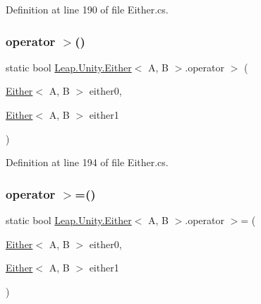 Definition at line 190 of file Either.\+cs.

\mbox{\label{struct_leap_1_1_unity_1_1_either_ae6ef9429d3c8ef042af9ca7c798aeb76}} 
\subsubsection{\texorpdfstring{operator $>$()}{operator >()}}
{\footnotesize\ttfamily static bool \mbox{\hyperlink{struct_leap_1_1_unity_1_1_either}{Leap.\+Unity.\+Either}}$<$ A, B $>$.operator $>$ (\begin{DoxyParamCaption}\item[{\mbox{\hyperlink{struct_leap_1_1_unity_1_1_either}{Either}}$<$ A, B $>$}]{either0,  }\item[{\mbox{\hyperlink{struct_leap_1_1_unity_1_1_either}{Either}}$<$ A, B $>$}]{either1 }\end{DoxyParamCaption})\hspace{0.3cm}{\ttfamily [static]}}



Definition at line 194 of file Either.\+cs.

\mbox{\label{struct_leap_1_1_unity_1_1_either_ae181b781714ebcac842831560838a723}} 
\subsubsection{\texorpdfstring{operator $>$=()}{operator >=()}}
{\footnotesize\ttfamily static bool \mbox{\hyperlink{struct_leap_1_1_unity_1_1_either}{Leap.\+Unity.\+Either}}$<$ A, B $>$.operator $>$= (\begin{DoxyParamCaption}\item[{\mbox{\hyperlink{struct_leap_1_1_unity_1_1_either}{Either}}$<$ A, B $>$}]{either0,  }\item[{\mbox{\hyperlink{struct_leap_1_1_unity_1_1_either}{Either}}$<$ A, B $>$}]{either1 }\end{DoxyParamCaption})\hspace{0.3cm}{\ttfamily [static]}}



